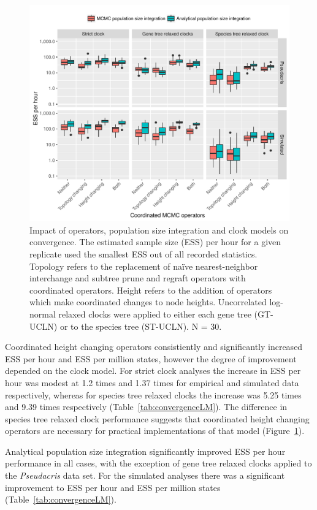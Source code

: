 \documentclass[12pt]{article}
\begin{document}
\begin{figure}[htb!]
\centering
\includegraphics[width=\textwidth]{minimum_ess_per_hour_starbeast2.pdf}
\caption
{Impact of operators, population size integration and clock models on
convergence. The estimated sample size (ESS) per hour for a given replicate
used the smallest ESS out of all recorded statistics. Topology refers to the
replacement of na\"ive nearest-neighbor interchange and subtree prune and
regraft operators with coordinated operators. Height refers to the addition of
operators which make coordinated changes to node heights. Uncorrelated log-
normal relaxed clocks were applied to either each gene tree (GT-UCLN) or to
the species tree (ST-UCLN). N = 30.}
\label{fig:realEssPerHour}
\end{figure}

Coordinated height changing operators consistiently and significantly
increased ESS per hour and ESS per million states, however the degree of
improvement depended on the clock model. For strict clock analyses the
increase in ESS per hour was modest at 1.2 times and 1.37 times for empirical
and simulated data respectively, whereas for species tree relaxed clocks the
increase was 5.25 times and 9.39 times respectively
(Table~\ref{tab:convergenceLM}). The difference in species tree relaxed
clock performance suggests that coordinated height changing operators are
necessary for practical implementations of that model
(Figure~\ref{fig:realEssPerHour}).

Analytical population size integration significantly improved ESS per hour
performance in all cases, with the exception of gene tree relaxed clocks
applied to the \textit{Pseudacris} data set. For the simulated analyses there
was a significant improvement to ESS per hour and ESS per million states
(Table~\ref{tab:convergenceLM}).
\end{document}
